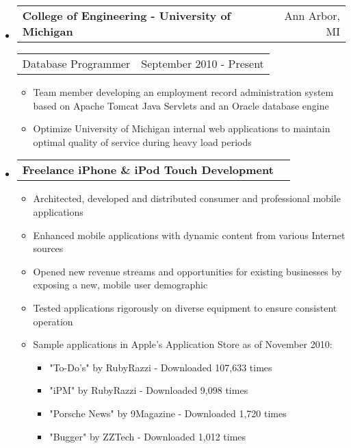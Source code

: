 \documentclass[letterpaper,11pt]{article}
\makeatletter
\newcommand{\resitem}[1]{\item #1 \vspace{-6pt}}
\newcommand{\ressubheadingnoitalics}[4]{
\begin{tabular*}{6.72in}{l@{\extracolsep{\fill}}r}
		\textbf{#1} & #2
\end{tabular*}
\begin{tabular*}{6.72in}{l@{\extracolsep{\fill}}r}
		#3 & #4
\end{tabular*}\vspace{-8pt}}
\newcommand{\ressubheadingoneline}[2]{
\begin{tabular*}{6.72in}{l@{\extracolsep{\fill}}r}
		\textbf{#1} & #2 \\
\end{tabular*}\vspace{-8pt}}
\makeatother
\begin{document}
\begin{itemize}
\begin{itemize}
	\end{itemize}
	\item
	\ressubheadingnoitalics{College of Engineering - University of Michigan}{Ann Arbor, MI}{Database Programmer}{September 2010 - Present}
\begin{itemize}
		\resitem{Team member developing an employment record administration system based on Apache Tomcat\vspace{-1.5mm} Java Servlets and an Oracle database engine}
		\resitem{Optimize University of Michigan internal web applications to maintain optimal quality of service\vspace{-1mm} during heavy load periods}
	\end{itemize}
	\item
	\ressubheadingoneline{Freelance iPhone \& iPod Touch Development}{}{}{}
	\begin{itemize}
		\resitem{Architected, developed and distributed consumer and professional mobile applications}
		\resitem{Enhanced mobile applications with dynamic content from various Internet sources}
		\resitem{Opened new revenue streams and opportunities for existing businesses by exposing a new, mobile\vspace{-1.5mm} user demographic}
		\resitem{Tested applications rigorously on diverse equipment to ensure consistent operation}
		\resitem{Sample applications in Apple's Application Store as of November 2010:
			\begin{itemize}
			\item \vspace{-1.5mm}
				"To-Do's" by RubyRazzi - Downloaded 107,633 times
			\item \vspace{-1mm}
				"iPM" by RubyRazzi - Downloaded 9,098 times
			\item \vspace{-1mm}
				"Porsche News" by 9Magazine - Downloaded 1,720 times
			\item \vspace{-1mm}
				"Bugger" by ZZTech - Downloaded 1,012 times
			\end{itemize}
		}
	\end{itemize}


\end{itemize}
\end{document}
